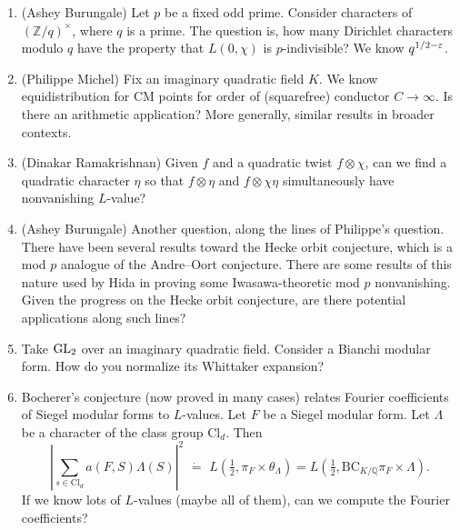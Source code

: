\documentclass[reqno]{amsart} 
\begin{document}
\begin{enumerate}
  For instance, the case of $H = \GL_{n-1} \times \GL_1$ inside $G = \GL_{n}$ is related to newvector theory (JPSS).  How about more generally $\GL_a \times \GL_b$, possibly for special $\pi$?
\item\label{enumerate:cnej3kgqgj} (Ashey Burungale) Let $p$ be a fixed odd prime.  Consider characters of $(\mathbb{Z} / q)^\times$, where $q$ is a prime.  The question is, how many Dirichlet characters modulo $q$ have the property that $L(0, \chi )$ is $p$-indivisible?  We know $q^{1/2 - \varepsilon}$.
\item\label{enumerate:cnej3kgrc4} (Philippe Michel) Fix an imaginary quadratic field $K$.  We know equidistribution for CM points for order of (squarefree) conductor $C \rightarrow \infty$.  Is there an arithmetic application?  More generally, similar results in broader contexts.
\item\label{enumerate:cnej3kgr45} (Dinakar Ramakrishnan) Given $f$ and a quadratic twist $f \otimes \chi$, can we find a quadratic character $\eta$ so that $f \otimes \eta$ and $f \otimes \chi \eta$ simultaneously have nonvanishing $L$-value?
\item\label{enumerate:cnej3kgsw6} (Ashey Burungale) Another question, along the lines of Philippe's question.  There have been several results toward the Hecke orbit conjecture, which is a mod $p$ analogue of the Andre--Oort conjecture.  There are some results of this nature used by Hida in proving some Iwasawa-theoretic mod $p$ nonvanishing.  Given the progress on the Hecke orbit conjecture, are there potential applications along such lines?
\item\label{enumerate:cnej3kgmi0} Take $\operatorname{GL}_2$ over an imaginary quadratic field.  Consider a Bianchi modular form.  How do you normalize its Whittaker expansion?
\item\label{enumerate:cnej3kglp3} Bocherer's conjecture (now proved in many cases) relates Fourier coefficients of Siegel modular forms to $L$-values.  Let $F$ be a Siegel modular form.  Let $\Lambda$ be a character of the class group $\mathrm{Cl}_d$.  Then
  \begin{equation*}
    \left\lvert \sum_{s \in \mathrm{Cl}_d } a(F, S) \Lambda(S)  \right\rvert^2
    \,\, \dot{=} \,\,
    L(\tfrac{1}{2}, \pi_F \times \theta_\Lambda)
    =
    L(\tfrac{1}{2}, \mathrm{BC}_{K/\mathbb{Q}} \pi_F \times \Lambda).
  \end{equation*}
  If we know lots of $L$-values (maybe all of them), can we compute the Fourier coefficients?


\end{enumerate}
\end{document}

